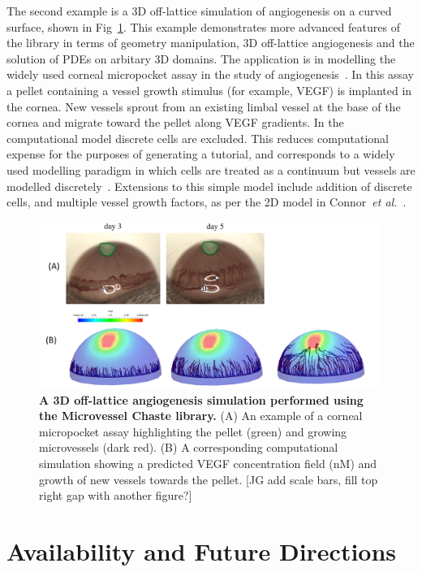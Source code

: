 \documentclass[10pt,letterpaper]{article}
\begin{document}
The second example is a 3D off-lattice simulation of angiogenesis on a curved surface, shown in Fig~\ref{fig4}. This example demonstrates more advanced features of the library in terms of geometry manipulation, 3D off-lattice angiogenesis and the solution of PDEs on arbitary 3D domains. The application is in modelling the widely used corneal micropocket assay in the study of angiogenesis~\cite{Connor2015}. In this assay a pellet containing a vessel growth stimulus (for example, VEGF) is implanted in the cornea. New vessels sprout from an existing limbal vessel at the base of the cornea and migrate toward the pellet along VEGF gradients. In the computational model discrete cells are excluded. This reduces computational expense for the purposes of generating a tutorial, and corresponds to a widely used modelling paradigm in which cells are treated as a continuum but vessels are modelled discretely~\cite{Secomb2013}. Extensions to this simple model include addition of discrete cells, and multiple vessel growth factors, as per the 2D model in Connor~\emph{et al.}~\cite{Connor2015}.

\begin{figure}[!h]
\centering
\includegraphics[width=0.99\textwidth]{Fig4.png}
\caption{{\bf A 3D off-lattice angiogenesis simulation performed using the Microvessel Chaste library.}
(A) An example of a corneal micropocket assay highlighting the pellet (green) and growing microvessels (dark red). (B) A corresponding computational simulation showing a predicted VEGF concentration field (nM) and growth of new vessels towards the pellet. [JG add scale bars, fill top right gap with another figure?]}
\label{fig4}
\end{figure}

\section*{Availability and Future Directions}
\end{document}
